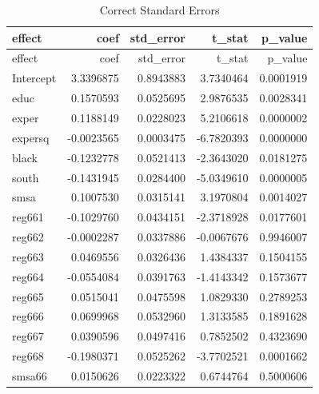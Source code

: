 \documentclass[11pt,]{article}
\newenvironment{Shaded}{\begin{snugshade}}{\end{snugshade}}
\newcommand{\KeywordTok}[1]{\textcolor[rgb]{0.13,0.29,0.53}{\textbf{#1}}}
\newcommand{\DataTypeTok}[1]{\textcolor[rgb]{0.13,0.29,0.53}{#1}}
\newcommand{\StringTok}[1]{\textcolor[rgb]{0.31,0.60,0.02}{#1}}
\newcommand{\OperatorTok}[1]{\textcolor[rgb]{0.81,0.36,0.00}{\textbf{#1}}}
\newcommand{\NormalTok}[1]{#1}
\begin{document}
\begin{longtable}[]{@{}lrrrr@{}}
\caption{Correct Standard Errors}\tabularnewline
\toprule
effect & coef & std\_error & t\_stat & p\_value\tabularnewline
\midrule
\endfirsthead
\toprule
effect & coef & std\_error & t\_stat & p\_value\tabularnewline
\midrule
\endhead
Intercept & 3.3396875 & 0.8943883 & 3.7340464 & 0.0001919\tabularnewline
educ & 0.1570593 & 0.0525695 & 2.9876535 & 0.0028341\tabularnewline
exper & 0.1188149 & 0.0228023 & 5.2106618 & 0.0000002\tabularnewline
expersq & -0.0023565 & 0.0003475 & -6.7820393 & 0.0000000\tabularnewline
black & -0.1232778 & 0.0521413 & -2.3643020 & 0.0181275\tabularnewline
south & -0.1431945 & 0.0284400 & -5.0349610 & 0.0000005\tabularnewline
smsa & 0.1007530 & 0.0315141 & 3.1970804 & 0.0014027\tabularnewline
reg661 & -0.1029760 & 0.0434151 & -2.3718928 & 0.0177601\tabularnewline
reg662 & -0.0002287 & 0.0337886 & -0.0067676 & 0.9946007\tabularnewline
reg663 & 0.0469556 & 0.0326436 & 1.4384337 & 0.1504155\tabularnewline
reg664 & -0.0554084 & 0.0391763 & -1.4143342 & 0.1573677\tabularnewline
reg665 & 0.0515041 & 0.0475598 & 1.0829330 & 0.2789253\tabularnewline
reg666 & 0.0699968 & 0.0532960 & 1.3133585 & 0.1891628\tabularnewline
reg667 & 0.0390596 & 0.0497416 & 0.7852502 & 0.4323690\tabularnewline
reg668 & -0.1980371 & 0.0525262 & -3.7702521 & 0.0001662\tabularnewline
smsa66 & 0.0150626 & 0.0223322 & 0.6744764 & 0.5000606\tabularnewline
\bottomrule
\end{longtable}

\begin{Shaded}
\end{Shaded}
\end{document}
